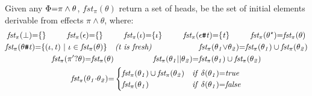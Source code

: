 \documentclass[acmsmall,10pt,review]{acmart}
\newcommand{\es}{\theta}
\newcommand{\ev}{\iota}
\newcommand{\effect}{\textcolor{black}{\ensuremath{\mathrm{\Phi}}}}
\newcommand{\seq}{\cdot}
\newcommand{\code}[1]{{\tt{\ensuremath{\m{#1}}}}}
\newcommand{\empt}{\textcolor{black}{\ensuremath{\epsilon}}}
\newcommand{\bott}{\textcolor{black}{\ensuremath{\bot}}}
\newcommand{\m}{\mathit}
\newcommand{\mysharp}{{\mathrel{\texttt{\#}}}}
\begin{document}
{\begin{definition}[First]\label{First}
  Given any \code{\effect {=} \pi \wedge \es},
  \code{fst_{{\pi}}(\es)} return a set of heads, be the set of initial elements   
  derivable from effects \code{\pi \wedge \es}, where: 
    { 
   \begin{gather*} 
  \code{fst_{{\pi}}( \bott) {=} \{\} } \qquad\ \ 
  \code{fst_{{\pi}}(\empt) {=}  \{\} } \qquad\ \ 
  \code{fst_{{\pi}}( \ev) {=} \{ \ev \}  }
  \qquad\ \ 
  \code{fst_{{\pi}}(  \epsilon \mysharp  t) {=}  \{ t \}}
  \qquad\ \ 
  \code{fst_{{\pi}}( {\es^\star} ) {=} fst_{{\pi}}({ \es})}
   \\
   \code{fst_{{\pi}}(\es \mysharp  t) {=}  \{(\ev, t) \ | \ \ev \in fst_{\pi}(\es) \}} 
   \ \ \  \emph{(t\ is\ fresh)}
  \qquad\quad 
  \qquad\quad
  \code{fst_{{\pi}}(  \es_1 {\vee} \es_2) {=} fst_{{\pi}}(  \es_1) \cup fst_{{\pi}}(  \es_2)  }  \\
  \code{fst_{{\pi}}( \pi^\prime? \es ) {=} fst_{\pi}(\es)  }
      \qquad\qquad\quad
     \code{fst_{{\pi}}(  \es_1 {||} \es_2) {=} fst_{{\pi}}(  \es_1) \cup fst_{{\pi}}(  \es_2)  }   
     \\
  {
  \code{fst_{{\pi}}(\es_1 {\seq} \es_2) {=} } 
  \begin{cases}
        \code{\code{fst_{{\pi}}(  \es_1)} \cup \code{fst_{{\pi}}(  \es_2)} } & \code{ if\ \delta(\es_1) {=} true}\\
        \code{\code{fst_{{\pi}}(  \es_1)}} & \code{  if\ \delta(\es_1) {=} false}
      \end{cases} 
      }  
  \end{gather*}
  }
\end{definition}

}
\end{document}
